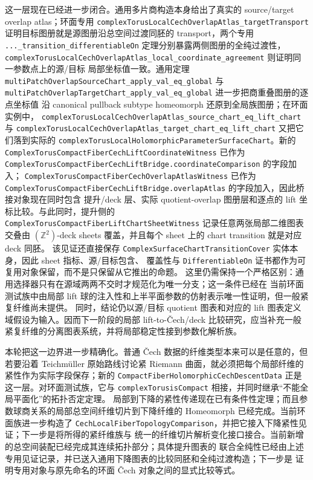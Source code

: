 \documentclass[UTF8,fontset=none,a4paper,11pt]{ctexart}
\begin{document}
\begin{sloppypar}
这一层现在已经进一步闭合。通用多片商构造本身给出了真实的 source/target overlap atlas；环面专用
\texttt{complexTorusLocalCechOverlapAtlas\_targetTransport} 证明目标图册就是源图册沿总空间过渡同胚的
transport，两个专用 \texttt{...\_transition\_differentiableOn} 定理分别暴露两侧图册的全纯过渡性，
\texttt{complexTorusLocalCechOverlapAtlas\_local\_coordinate\_agreement} 则证明同一参数点上的源/目标
局部坐标值一致。通用定理
\texttt{multiPatchOverlapSourceChart\_apply\_val\_eq\_global} 与
\texttt{multiPatchOverlapTargetChart\_apply\_val\_eq\_global} 进一步把商重叠图册的逐点坐标值
沿 canonical pullback subtype homeomorph 还原到全局族图册；在环面实例中，
\texttt{complexTorusLocalCechOverlapAtlas\_source\_chart\_eq\_lift\_chart} 与
\texttt{complexTorusLocalCechOverlapAtlas\_target\_chart\_eq\_lift\_chart} 又把它们落到实际的
\texttt{complexTorusLocalHolomorphicParameterSurfaceChart}。新的
\texttt{ComplexTorusCompactFiberCechLiftCoordinateWitness} 已作为
\texttt{ComplexTorusCompactFiberCechLiftBridge.coordinateComparison} 的字段加入；
\texttt{ComplexTorusCompactFiberCechOverlapAtlasWitness} 已作为
\texttt{ComplexTorusCompactFiberCechLiftBridge.overlapAtlas} 的字段加入，因此桥接对象现在同时包含
提升/deck 层、实际 quotient-overlap 图册层和逐点的 lift 坐标比较。与此同时，提升侧的
\texttt{ComplexTorusCompactFiberLiftChartSheetWitness} 记录任意两张局部二维图表交叠由
\((\mathbb Z^2)\)-deck sheets 覆盖，并且每个 sheet 上的 chart transition 就是对应 deck 同胚。
该见证还直接保存 \texttt{ComplexSurfaceChartTransitionCover} 实体本身，因此 sheet 指标、源/目标包含、
覆盖性与 \texttt{DifferentiableOn} 证书都作为可复用对象保留，而不是只保留从它推出的命题。
这里仍需保持一个严格区别：通用选择器只有在源域两两不交时才规范化为唯一分支；这一条件已经在
当前环面测试族中由局部 lift 球的注入性和上半平面参数的仿射表示唯一性证明，但一般紧复纤维尚未提供。
同时，结论仍以源/目标 quotient 图表和对应的 lift 图表定义域假设为输入。因而下一阶段的局部
lift-to-Čech/deck 比较研究，应当补充一般紧复纤维的分离图表系统，并将局部稳定性接到参数化解析族。
\end{sloppypar}

本轮把这一边界进一步精确化。普通 Čech 数据的纤维类型本来可以是任意的，但若要沿着 Teichmüller
原始路线讨论紧 Riemann 曲面，就必须把每个局部纤维的紧性作为实际字段保存；新的
\texttt{CompactFiberHolomorphicCechDescentData} 正是这一层。对环面测试族，它与
\texttt{complexTorus\allowbreak isCompact} 相接，并同时继承“不能全局平面化”的拓扑否定定理。
局部到下降的紧性传递现在已有条件性定理；而且参数球商关系的局部总空间纤维切片到下降纤维的
Homeomorph 已经完成。当前环面族进一步构造了
\texttt{CechLocalFiberTopologyComparison}，并把它接入下降紧性见证；下一步是将所得的紧纤维族与
统一的纤维切片解析变化接口接合。当前新增的总空间装配已经完成其连续拓扑部分；具体提升图表的
联合全纯性已经由上述专用见证记录，并已送入通用下降图表的比较同胚和全纯过渡构造；下一步是
证明专用对象与原先命名的环面 Čech 对象之间的显式比较等式。
\end{document}
